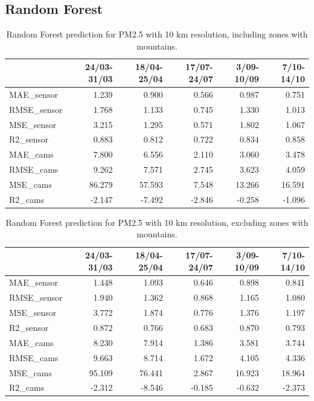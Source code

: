 \subsection{Random Forest}
\begin{table}[H]
\begin{tabular}{lrrrrr}
\toprule
 &  24/03-31/03 &  18/04-25/04 &  17/07-24/07 &  3/09-10/09 &  7/10-14/10 \\
\midrule
 MAE\_sensor &        1.239 &        0.900 &        0.566 &       0.987 &       0.751 \\
RMSE\_sensor &        1.768 &        1.133 &        0.745 &       1.330 &       1.013 \\
 MSE\_sensor &        3.215 &        1.295 &        0.571 &       1.802 &       1.067 \\
  R2\_sensor &        0.883 &        0.812 &        0.722 &       0.834 &       0.858 \\
   MAE\_cams &        7.800 &        6.556 &        2.110 &       3.060 &       3.478 \\
  RMSE\_cams &        9.262 &        7.571 &        2.745 &       3.623 &       4.059 \\
   MSE\_cams &       86.279 &       57.593 &        7.548 &      13.266 &      16.591 \\
    R2\_cams &       -2.147 &       -7.492 &       -2.846 &      -0.258 &      -1.096 \\
\bottomrule
\end{tabular}
\caption{Random Forest prediction for PM2.5 with 10 km resolution, including zones with mountains.}
\end{table}
\begin{table}[H]
\begin{tabular}{lrrrrr}
\toprule
 &  24/03-31/03 &  18/04-25/04 &  17/07-24/07 &  3/09-10/09 &  7/10-14/10 \\
\midrule
 MAE\_sensor &        1.448 &        1.093 &        0.646 &       0.898 &       0.841 \\
RMSE\_sensor &        1.940 &        1.362 &        0.868 &       1.165 &       1.080 \\
 MSE\_sensor &        3.772 &        1.874 &        0.776 &       1.376 &       1.197 \\
  R2\_sensor &        0.872 &        0.766 &        0.683 &       0.870 &       0.793 \\
   MAE\_cams &        8.230 &        7.914 &        1.386 &       3.581 &       3.744 \\
  RMSE\_cams &        9.663 &        8.714 &        1.672 &       4.105 &       4.336 \\
   MSE\_cams &       95.109 &       76.441 &        2.867 &      16.923 &      18.964 \\
    R2\_cams &       -2.312 &       -8.546 &       -0.185 &      -0.632 &      -2.373 \\
\bottomrule
\bottomrule
\end{tabular}
\caption{Random Forest prediction for PM2.5 with 10 km resolution, excluding zones with mountains.}
\end{table}
